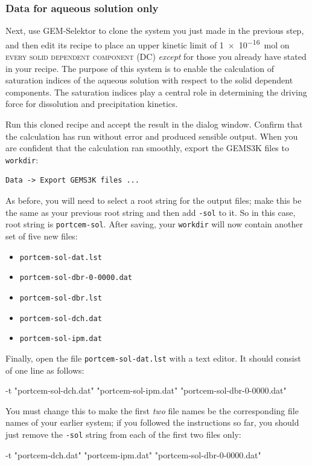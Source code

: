 \documentclass{article}
\begin{document}
\subsubsection{Data for aqueous solution only}
Next, use GEM-Selektor to clone the system you just made in the previous step, and then
edit its recipe to place an upper kinetic limit of \SI{1e-16}{\mole} on \textsc{every
solid dependent component} (DC) \textit{except} for those  you already have stated in your
recipe.
The purpose of this system is to enable the calculation
of saturation indices of the aqueous solution with respect to the solid dependent components.
The saturation indices play a central role in determining the driving force for dissolution
and precipitation kinetics.

Run this cloned recipe and accept the result in the dialog window.  Confirm
that the calculation has run without error and produced sensible output.  When you are
confident that the calculation ran smoothly, export the GEMS3K files to \verb!workdir!:
\begin{verbatim}
Data -> Export GEMS3K files ...
\end{verbatim}
As before, you will need to select a root string for the output files; make this be the
same as your previous root string and then add \verb!-sol! to it.  So in this case,
root string is \verb!portcem-sol!.  After saving, your \verb!workdir! will now contain another
set of five new files:
\begin{itemize}
    \item \verb!portcem-sol-dat.lst!
    \item \verb!portcem-sol-dbr-0-0000.dat!
    \item \verb!portcem-sol-dbr.lst!
    \item \verb!portcem-sol-dch.dat!
    \item \verb!portcem-sol-ipm.dat!
\end{itemize}

Finally, open the file \verb!portcem-sol-dat.lst! with a text editor. It should consist
of one line as follows:
\small{
\begin{verbatim*}
-t "portcem-sol-dch.dat" "portcem-sol-ipm.dat" "portcem-sol-dbr-0-0000.dat"
\end{verbatim*}
}

\normalsize{ }
You must change this to make the first \textit{two} file names be the corresponding file names
of your earlier system; if you followed the instructions so far, you should just remove
the \verb!-sol! string from each of the first two files only:
\small{
\begin{verbatim*}
-t "portcem-dch.dat" "portcem-ipm.dat" "portcem-sol-dbr-0-0000.dat"
\end{verbatim*}
}
\end{document}
